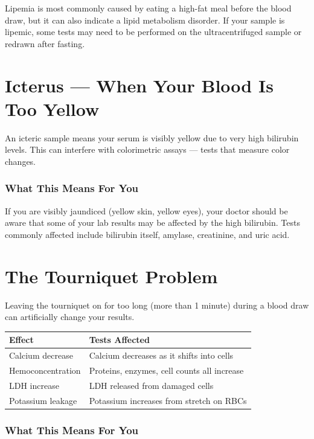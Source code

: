 Lipemia is most commonly caused by eating a high-fat meal before the blood draw, but it can also indicate a lipid metabolism disorder. If your sample is lipemic, some tests may need to be performed on the ultracentrifuged sample or redrawn after fasting.

\clearpage
\section{Icterus --- When Your Blood Is Too Yellow}

An icteric sample means your serum is visibly yellow due to very high bilirubin levels. This can interfere with colorimetric assays --- tests that measure color changes.

\subsubsection{What This Means For You}

If you are visibly jaundiced (yellow skin, yellow eyes), your doctor should be aware that some of your lab results may be affected by the high bilirubin. Tests commonly affected include bilirubin itself, amylase, creatinine, and uric acid.

\clearpage
\section{The Tourniquet Problem}

Leaving the tourniquet on for too long (more than 1 minute) during a blood draw can artificially change your results.

\begin{longtable}{@{}ll@{}}
\toprule
\textbf{Effect} & \textbf{Tests Affected} \\
\midrule
Calcium decrease & Calcium decreases as it shifts into cells \\
Hemoconcentration & Proteins, enzymes, cell counts all increase \\
LDH increase & LDH released from damaged cells \\
Potassium leakage & Potassium increases from stretch on RBCs \\
\bottomrule
\end{longtable}

\subsubsection{What This Means For You}

